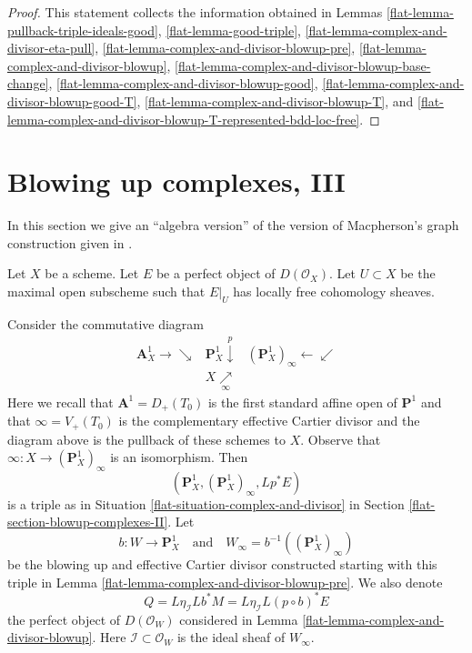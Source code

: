 \begin{proof}

This statement collects the information obtained in
Lemmas \ref{flat-lemma-pullback-triple-ideals-good},
\ref{flat-lemma-good-triple},
\ref{flat-lemma-complex-and-divisor-eta-pull},
\ref{flat-lemma-complex-and-divisor-blowup-pre},
\ref{flat-lemma-complex-and-divisor-blowup},
\ref{flat-lemma-complex-and-divisor-blowup-base-change},
\ref{flat-lemma-complex-and-divisor-blowup-good},
\ref{flat-lemma-complex-and-divisor-blowup-good-T},
\ref{flat-lemma-complex-and-divisor-blowup-T}, and
\ref{flat-lemma-complex-and-divisor-blowup-T-represented-bdd-loc-free}.
\end{proof}

\section{Blowing up complexes, III}
\label{flat-section-blowup-complexes-III}
In this section we give an ``algebra version'' of the version of
Macpherson's graph construction given in \cite[Section 18.1]{F}.

\medskip\noindent
Let $X$ be a scheme. Let $E$ be a perfect object of $D(\mathcal{O}_X)$.
Let $U \subset X$ be the maximal open subscheme such that
$E|_U$ has locally free cohomology sheaves.

\medskip\noindent
Consider the commutative diagram
$$
\begin{array}{ccc}\mathbf{A}^1_X \longrightarrow\searrow & \mathbf{P}^1_X \overset{p}{\downarrow} & (\mathbf{P}^1_X)_\infty \longleftarrow\swarrow \\  & X \underset{\infty}{\nearrow} & \end{array}
$$
Here we recall that $\mathbf{A}^1 = D_+(T_0)$ is the first standard
affine open of $\mathbf{P}^1$ and that $\infty = V_+(T_0)$ is the
complementary effective Cartier divisor and the diagram above
is the pullback of these schemes to $X$. Observe that
$\infty : X \to (\mathbf{P}^1_X)_\infty$ is an isomorphism.
Then
$$
(\mathbf{P}^1_X, (\mathbf{P}^1_X)_\infty, Lp^*E)
$$
is a triple as in Situation \ref{flat-situation-complex-and-divisor}
in Section \ref{flat-section-blowup-complexes-II}.
Let
$$
b : W \longrightarrow \mathbf{P}^1_X\quad\text{and}\quad
W_\infty = b^{-1}((\mathbf{P}^1_X)_\infty)
$$
be the blowing up and effective Cartier divisor constructed
starting with this triple in
Lemma \ref{flat-lemma-complex-and-divisor-blowup-pre}.
We also denote
$$
Q = L\eta_{\mathcal{I}} Lb^*M = L\eta_\mathcal{I} L(p \circ b)^*E
$$
the perfect object of $D(\mathcal{O}_W)$
considered in Lemma \ref{flat-lemma-complex-and-divisor-blowup}.
Here $\mathcal{I} \subset \mathcal{O}_W$ is the ideal sheaf
of $W_\infty$.

